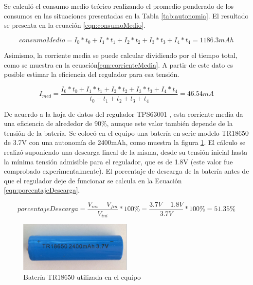 Se calculó el consumo medio teórico realizando el promedio ponderado de los consumos en las situaciones presentadas en la Tabla \ref{tab:autonomia}. El resultado se presenta en la ecuación \ref{eqn:consumoMedio}.

\begin{equation} \label{eqn:consumoMedio}
consumoMedio = I_{0}*t_{0}+I_{1}*t_{1}+I_{2}*t_{2}+I_{3}*t_{3}+I_{4}*t_{4} = 1186.3 mAh
\end{equation}



Asimismo, la corriente media se puede calcular dividiendo por el tiempo total, como se muestra en la ecuación\ref{eqn:corrienteMedia}. A partir de este dato es posible estimar la eficiencia del regulador para esa tensión.

\begin{equation} \label{eqn:corrienteMedia}
I_{med} = \frac{I_{0}*t_{0}+I_{1}*t_{1}+I_{2}*t_{2}+I_{3}*t_{3}+I_{4}*t_{4}}{t_{0}+t_{1}+t_{2}+t_{3}+t_{4}}= 46.54mA
\end{equation}

De acuerdo a la hoja de datos del regulador TPS63001 \citep{texas2006}, esta corriente media da una eficiencia de alrededor de 90\%, aunque este valor también depende de la tensión de la batería.
Se colocó en el equipo una batería en serie modelo TR18650 de 3.7V con una autonomía de 2400mAh, como muestra la figura \ref{fig:bateria}. El cálculo se realizó suponiendo una descarga lineal de la misma, desde su tensión inicial hasta la mínima tensión admisible para el regulador, que es de 1.8V\citep{texas2006} (este valor fue comprobado experimentalmente). El porcentaje de descarga de la batería antes de que el regulador deje de funcionar se calcula en la Ecuación \ref{eqn:porcentajeDescarga}.

\begin{equation} \label{eqn:porcentajeDescarga}
porcentajeDescarga = \frac{V_{ini} - V_{fin}}{V_{ini}} * 100\% = \frac{3.7V- 1.8V}{3.7V} * 100\% = 51.35\%
\end{equation}

\begin{figure}[!htbp]
	\centering	
	\includegraphics[width=0.5\textwidth]{./Figures/bateria.jpeg}			
	\caption{Batería TR18650 utilizada en el equipo}
	\label{fig:bateria}
\end{figure}

